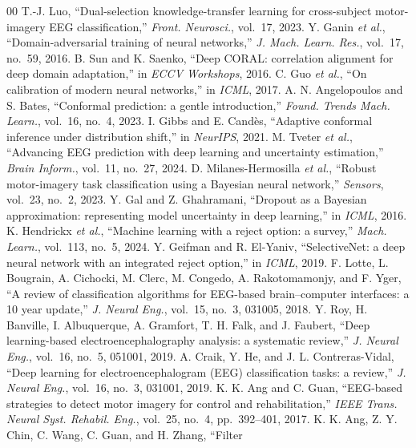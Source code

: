 \documentclass[journal]{IEEEtran}
\begin{document}
\begin{thebibliography}{00}
 T.-J. Luo, ``Dual-selection knowledge-transfer learning for
cross-subject motor-imagery EEG classification,'' \emph{Front. Neurosci.}, vol.~17,
2023.
 Y. Ganin \emph{et al.}, ``Domain-adversarial training of neural
networks,'' \emph{J. Mach. Learn. Res.}, vol.~17, no.~59, 2016.
 B. Sun and K. Saenko, ``Deep CORAL: correlation alignment for deep
domain adaptation,'' in \emph{ECCV Workshops}, 2016.
 C. Guo \emph{et al.}, ``On calibration of modern neural networks,''
in \emph{ICML}, 2017.
 A. N. Angelopoulos and S. Bates, ``Conformal prediction:
a gentle introduction,'' \emph{Found. Trends Mach. Learn.}, vol.~16, no.~4, 2023.
 I. Gibbs and E. Cand\`es, ``Adaptive conformal inference under
distribution shift,'' in \emph{NeurIPS}, 2021.
 M. Tveter \emph{et al.}, ``Advancing EEG prediction with deep
learning and uncertainty estimation,'' \emph{Brain Inform.}, vol.~11, no.~27, 2024.
 D. Milanes-Hermosilla \emph{et al.}, ``Robust motor-imagery
task classification using a Bayesian neural network,'' \emph{Sensors}, vol.~23,
no.~2, 2023.
 Y. Gal and Z. Ghahramani, ``Dropout as a Bayesian approximation:
representing model uncertainty in deep learning,'' in \emph{ICML}, 2016.
 K. Hendrickx \emph{et al.}, ``Machine learning with a reject
option: a survey,'' \emph{Mach. Learn.}, vol.~113, no.~5, 2024.
 Y. Geifman and R. El-Yaniv, ``SelectiveNet: a deep neural
network with an integrated reject option,'' in \emph{ICML}, 2019.
 F. Lotte, L. Bougrain, A. Cichocki, M. Clerc, M. Congedo,
A. Rakotomamonjy, and F. Yger, ``A review of classification algorithms for
EEG-based brain--computer interfaces: a 10 year update,'' \emph{J. Neural Eng.},
vol.~15, no.~3, 031005, 2018.
 Y. Roy, H. Banville, I. Albuquerque, A. Gramfort, T. H. Falk, and
J. Faubert, ``Deep learning-based electroencephalography analysis: a systematic
review,'' \emph{J. Neural Eng.}, vol.~16, no.~5, 051001, 2019.
 A. Craik, Y. He, and J. L. Contreras-Vidal, ``Deep learning for
electroencephalogram (EEG) classification tasks: a review,'' \emph{J. Neural Eng.},
vol.~16, no.~3, 031001, 2019.
 K. K. Ang and C. Guan, ``EEG-based strategies to detect motor
imagery for control and rehabilitation,'' \emph{IEEE Trans. Neural Syst. Rehabil.
Eng.}, vol.~25, no.~4, pp.~392--401, 2017.
 K. K. Ang, Z. Y. Chin, C. Wang, C. Guan, and H. Zhang, ``Filter

\end{thebibliography}
\end{document}
